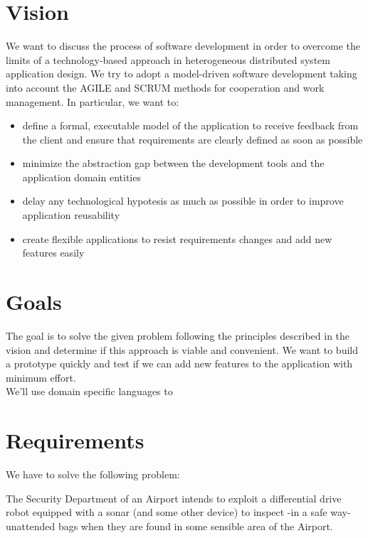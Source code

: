 \documentclass{llncs}
\newcommand{\labelsec}[1]{\label{sec:#1}}
\begin{document}
\section{Vision}
\labelsec{Vision}
We want to discuss the process of software development in order to overcome the limits of a technology-based approach in heterogeneous distributed system application design.
We try to adopt a model-driven software development taking into account the AGILE and SCRUM methods for cooperation and work management.
In particular, we want to:
\begin{itemize}
\item define a formal, executable model of the application to receive feedback from the client and ensure that requirements are clearly defined as soon as possible 
\item minimize the abstraction gap between the development tools and the application domain entities
\item delay any technological hypotesis as much as possible in order to improve application reusability
\item create flexible applications to resist requirements changes and add new features easily
\end{itemize}
\section{Goals}
\labelsec{Goals}
The goal is to solve the given problem following the principles described in the vision and determine if this approach is viable and convenient. We want to build a prototype quickly and test if we can add new features to the application with minimum effort.\\
We'll use domain specific languages to
\section{Requirements}
\labelsec{Requirements}
We have to solve the following problem:

The Security Department of an Airport intends to exploit a differential drive robot equipped with a sonar (and some other device) to inspect -in a safe way- unattended bags when they are found in some sensible area of the Airport.
 
\end{document}
